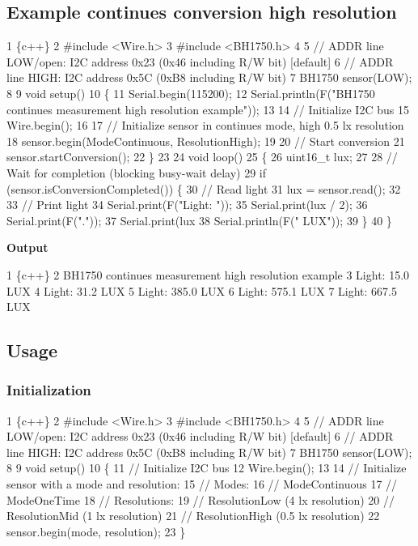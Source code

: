 \subsection*{Example continues conversion high resolution}


\begin{DoxyCode}
1 \{c++\}
2 #include <Wire.h>
3 #include <BH1750.h>
4 
5 // ADDR line LOW/open:  I2C address 0x23 (0x46 including R/W bit) [default]
6 // ADDR line HIGH:      I2C address 0x5C (0xB8 including R/W bit)
7 BH1750 sensor(LOW);
8 
9 void setup()
10 \{
11   Serial.begin(115200);
12   Serial.println(F("BH1750 continues measurement high resolution example"));
13 
14   // Initialize I2C bus
15   Wire.begin();
16 
17   // Initialize sensor in continues mode, high 0.5 lx resolution
18   sensor.begin(ModeContinuous, ResolutionHigh);
19 
20   // Start conversion
21   sensor.startConversion();
22 \}
23 
24 void loop()
25 \{
26   uint16\_t lux;
27 
28   // Wait for completion (blocking busy-wait delay)
29   if (sensor.isConversionCompleted()) \{
30     // Read light
31     lux = sensor.read();
32 
33     // Print light
34     Serial.print(F("Light: "));
35     Serial.print(lux / 2);
36     Serial.print(F("."));
37     Serial.print(lux %
38     Serial.println(F(" LUX"));
39   \}
40 \}
\end{DoxyCode}
 {\bfseries Output} 
\begin{DoxyCode}
1 \{c++\}
2 BH1750 continues measurement high resolution example
3 Light: 15.0 LUX
4 Light: 31.2 LUX
5 Light: 385.0 LUX
6 Light: 575.1 LUX
7 Light: 667.5 LUX
\end{DoxyCode}


\subsection*{Usage}

\subsubsection*{Initialization}


\begin{DoxyCode}
1 \{c++\}
2 #include <Wire.h>
3 #include <BH1750.h>
4 
5 // ADDR line LOW/open:  I2C address 0x23 (0x46 including R/W bit) [default]
6 // ADDR line HIGH:      I2C address 0x5C (0xB8 including R/W bit)
7 BH1750 sensor(LOW);
8 
9 void setup()
10 \{
11     // Initialize I2C bus
12     Wire.begin();
13 
14     // Initialize sensor with a mode and resolution:
15     //   Modes:
16     //     ModeContinuous
17     //     ModeOneTime
18     //   Resolutions:
19     //     ResolutionLow (4 lx resolution)
20     //     ResolutionMid (1 lx resolution)
21     //     ResolutionHigh (0.5 lx resolution)
22     sensor.begin(mode, resolution);
23 \}
\end{DoxyCode}


